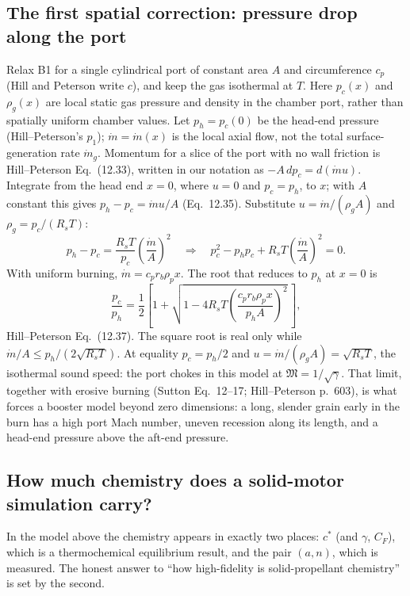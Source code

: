 \subsection{The first spatial correction: pressure drop along the port}
Relax B1 for a single cylindrical port of constant area $A$ and
circumference $c_p$ (Hill and Peterson write $c$), and keep the gas
isothermal at $T$. Here $p_c(x)$ and $\rho_g(x)$ are local static
gas pressure and density in the chamber port, rather than spatially
uniform chamber values. Let $p_h=p_c(0)$ be the head-end pressure
(Hill--Peterson's $p_1$); $\dot m=\dot m(x)$ is the local axial flow,
not the total surface-generation rate $\dot m_g$. Momentum for a slice of the port with no wall friction
is Hill--Peterson Eq.~(12.33), written in our notation as
$-A\,dp_c=d(\dot m u)$. Integrate from the head
end $x=0$, where $u=0$ and $p_c=p_h$, to $x$; with $A$ constant this gives
$p_h-p_c=\dot mu/A$ (Eq.~12.35). Substitute $u=\dot m/(\rho_g A)$ and
$\rho_g=p_c/(R_sT)$:
\[
 p_h-p_c=\frac{R_sT}{p_c}\left(\frac{\dot m}{A}\right)^2
 \quad\Longrightarrow\quad
 p_c^2-p_h p_c+R_sT\left(\frac{\dot m}{A}\right)^2=0 .
\]
With uniform burning, $\dot m=c_p r_b\rho_px$. The root that reduces to $p_h$
at $x=0$ is
\begin{equation}\label{eq:sb-port}
 \frac{p_c}{p_h}=\frac12\left[1+\sqrt{1-4R_sT\left(\frac{c_p r_b\rho_px}{p_hA}\right)^2}\,\right],
\end{equation}
Hill--Peterson Eq.~(12.37). The square root is real only while
$\dot m/A\le p_h/(2\sqrt{R_sT})$. At equality $p_c=p_h/2$ and
$u=\dot m/(\rho_g A)=\sqrt{R_sT}$, the isothermal sound speed: the port chokes
in this model at $\mathfrak M=1/\sqrt\gamma$. That limit, together with erosive
burning (Sutton Eq.~12--17; Hill--Peterson p.~603), is what forces a booster
model beyond zero dimensions: a long, slender grain early in the burn has a
high port Mach number, uneven recession along its length, and a head-end
pressure above the aft-end pressure.

\subsection{How much chemistry does a solid-motor simulation carry?}
In the model above the chemistry appears in exactly two places: $c^*$ (and
$\gamma$, $C_F$), which is a thermochemical equilibrium result, and the pair
$(a,n)$, which is measured. The honest answer to ``how high-fidelity is
solid-propellant chemistry'' is set by the second.

